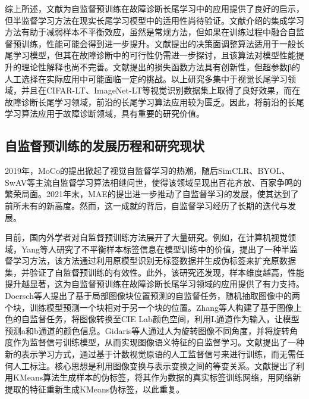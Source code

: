 \documentclass[master]{thesis-uestc}
\begin{document}
综上所述，文献\cite{yang2020rethinking}为自监督预训练在故障诊断长尾学习中的应用提供了良好的启示，但半监督学习方法在现实长尾学习模型中的适用性尚待验证。文献\cite{wu2023personalized,吴亮2023基于多级学习的长尾分布下交通多目标检测}介绍的集成学习方法有助于减弱样本不平衡效应，虽然是常规方法，但如果在训练过程中融合自监督预训练，性能可能会得到进一步提升。文献\cite{wang2023margin}提出的决策面调整算法适用于一般长尾学习模型，但其在故障诊断中的可行性仍需进一步探讨，且该算法对模型性能提升的理论性解释也尚不完善。文献\cite{cui2019class}提出的损失函数方法具有创新性，但超参数β的人工选择在实际应用中可能面临一定的挑战。以上研究多集中于视觉长尾学习领域，并且在CIFAR-LT、ImageNet-LT等视觉识别数据集上取得了良好效果，而在故障诊断长尾学习领域，前沿的长尾学习算法应用较为匮乏。因此，将前沿的长尾学习算法应用于故障诊断领域，具有重要的研究价值。

\subsection{自监督预训练的发展历程和研究现状}

2019年，MoCo的提出掀起了视觉自监督学习的热潮，随后SimCLR、BYOL、SwAV等主流自监督学习算法相继问世，使得该领域呈现出百花齐放、百家争鸣的繁荣局面。2021年末，MAE的提出进一步推动了自监督学习的发展，使其达到了前所未有的新高度。然而，这一成就的背后，自监督学习经历了长期的迭代与发展。

目前，国内外学者对自监督预训练方法展开了大量研究。例如，在计算机视觉领域，Yang等人研究了不平衡样本标签信息在模型训练中的价值，提出了一种半监督学习方法，该方法通过利用原模型识别无标签数据并生成伪标签来扩充原数据集，并验证了自监督预训练的有效性。此外，该研究还发现，样本维度越高，性能提升越显著，这为自监督预训练在故障诊断长尾学习领域的应用提供了有力支持。Doersch等人提出了基于局部图像块位置预测的自监督任务，随机抽取图像中的两个块，训练模型预测一个块相对于另一个块的位置。Zhang等人构建了基于图像上色的自监督任务，将图像转换至CIE Lab颜色空间，利用L通道作为输入，让模型预测a和b通道的颜色信息。Gidaris等人通过人为旋转图像不同角度，并将旋转角度作为监督信号训练模型，从而实现图像语义特征的自监督学习。文献\cite{noroozi2017representation}提出了一种新的表示学习方式，通过基于计数视觉原语的人工监督信号来进行训练，而无需任何人工标注。核心思想是利用图像变换与表示变换之间的等变关系。文献\cite{caron2018deep}提出了利用KMeans算法生成样本的伪标签，将其作为数据的真实标签训练网络，用网络新提取的特征重新生成KMeans伪标签，以此重复。
\end{document}
